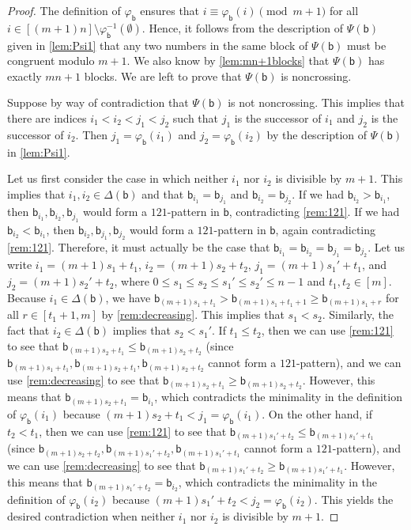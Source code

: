 \documentclass[11pt]{amsart}
\theoremstyle{definition}
\begin{document}
\begin{proof}
The definition of $\varphi_{\mathsf b}$ ensures that $i\equiv\varphi_{\mathsf b}(i)\pmod{m+1}$ for all $i\in[(m+1)n]\setminus\varphi_{\mathsf b}^{-1}(\emptyset)$. Hence, it follows from the description of $\Psi(\mathsf b)$ given in \cref{lem:Psi1} that any two numbers in the same block of $\Psi(\mathsf b)$ must be congruent modulo $m+1$. We also know by \cref{lem:mn+1blocks} that $\Psi(\mathsf b)$ has exactly $mn+1$ blocks. We are left to prove that $\Psi(\mathsf b)$ is noncrossing. 

Suppose by way of contradiction that $\Psi(\mathsf b)$ is not noncrossing. This implies that there are indices $i_1<i_2<j_1<j_2$ such that $j_1$ is the successor of $i_1$ and $j_2$ is the successor of $i_2$. Then $j_1=\varphi_{\mathsf b}(i_1)$ and $j_2=\varphi_{\mathsf b}(i_2)$ by the description of $\Psi(\mathsf b)$ in \cref{lem:Psi1}. 

Let us first consider the case in which neither $i_1$ nor $i_2$ is divisible by $m+1$. This implies that $i_1,i_2\in\Delta(\mathsf b)$ and that $\mathsf b_{i_1}=\mathsf b_{j_1}$ and $\mathsf b_{i_2}=\mathsf b_{j_2}$. If we had $\mathsf b_{i_2}>\mathsf b_{i_1}$, then $\mathsf b_{i_1},\mathsf b_{i_2},\mathsf b_{j_1}$ would form a $121$-pattern in $\mathsf b$, contradicting \cref{rem:121}. If we had $\mathsf b_{i_2}<\mathsf b_{i_1}$, then $\mathsf b_{i_2},\mathsf b_{j_1},\mathsf b_{j_2}$ would form a $121$-pattern in $\mathsf b$, again contradicting \cref{rem:121}. Therefore, it must actually be the case that $\mathsf b_{i_1}=\mathsf b_{i_2}=\mathsf b_{j_1}=\mathsf b_{j_2}$. Let us write $i_1=(m+1)s_1+t_1$, $i_2=(m+1)s_2+t_2$, $j_1=(m+1)s_1'+t_1$, and $j_2=(m+1)s_2'+t_2$, where $0\leq s_1\leq s_2\leq s_1'\leq s_2'\leq n-1$ and $t_1,t_2\in[m]$. Because $i_1\in\Delta(\mathsf b)$, we have $\mathsf b_{(m+1)s_1+t_1}>\mathsf b_{(m+1)s_1+t_1+1}\geq\mathsf b_{(m+1)s_1+r}$ for all $r\in[t_1+1,m]$ by \cref{rem:decreasing}. This implies that $s_1<s_2$. Similarly, the fact that $i_2\in\Delta(\mathsf b)$ implies that $s_2<s_1'$. If $t_1\leq t_2$, then we can use \cref{rem:121} to see that $\mathsf b_{(m+1)s_2+t_1}\leq \mathsf b_{(m+1)s_2+t_2}$ (since $\mathsf b_{(m+1)s_1+t_1},\mathsf b_{(m+1)s_2+t_1},\mathsf b_{(m+1)s_2+t_2}$ cannot form a $121$-pattern), and we can use \cref{rem:decreasing} to see that $\mathsf b_{(m+1)s_2+t_1}\geq \mathsf b_{(m+1)s_2+t_2}$. However, this means that $\mathsf b_{(m+1)s_2+t_1}=\mathsf b_{i_1}$, which contradicts the minimality in the definition of $\varphi_{\mathsf b}(i_1)$ because $(m+1)s_2+t_1<j_1=\varphi_{\mathsf b}(i_1)$. On the other hand, if $t_2<t_1$, then we can use \cref{rem:121} to see that $\mathsf b_{(m+1)s_1'+t_2}\leq \mathsf b_{(m+1)s_1'+t_1}$ (since $\mathsf b_{(m+1)s_2+t_2},\mathsf b_{(m+1)s_1'+t_2},\mathsf b_{(m+1)s_1'+t_1}$ cannot form a $121$-pattern), and we can use \cref{rem:decreasing} to see that $\mathsf b_{(m+1)s_1'+t_2}\geq \mathsf b_{(m+1)s_1'+t_1}$. However, this means that $\mathsf b_{(m+1)s_1'+t_2}=\mathsf b_{i_2}$, which contradicts the minimality in the definition of $\varphi_{\mathsf b}(i_2)$ because $(m+1)s_1'+t_2<j_2=\varphi_{\mathsf b}(i_2)$. This yields the desired contradiction when neither $i_1$ nor $i_2$ is divisible by $m+1$. 


\end{proof}
\end{document}
